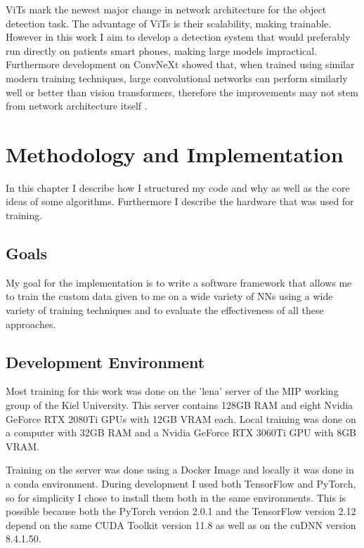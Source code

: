 \documentclass[10pt]{book}
\begin{document}
\acp{ViT} mark the newest major change in network architecture for the object detection task. The advantage of \acp{ViT} is their scalability, making \cite[models of unprecedented size]{dosovitskiy2020image} trainable. However in this work I aim to develop a detection system that would preferably run directly on patients smart phones, making large models impractical. Furthermore development on ConvNeXt showed that, when trained using similar modern training techniques, large convolutional networks can perform similarly well or better than vision transformers, therefore the improvements may not stem from network architecture itself \cite{liu2022convnet}.

\chapter{Methodology and Implementation}
\label{chap:implement}

In this chapter I describe how I structured my code and why as well as the core ideas of some algorithms. Furthermore I describe the hardware that was used for training.

\section{Goals}

My goal for the implementation is to write a software framework that allows me to train the custom data given to me on a wide variety of \acp{NN} using a wide variety of training techniques and to evaluate the effectiveness of all these approaches.

\section{Development Environment}

Most training for this work was done on the 'lena' server of the \ac{MIP} working group of the Kiel University. This server contains 128GB RAM and eight Nvidia GeForce RTX 2080Ti \acp{GPU} with 12GB VRAM each. Local training was done on a computer with 32GB RAM and a Nvidia GeForce RTX 3060Ti \ac{GPU} with 8GB VRAM.

Training on the server was done using a Docker Image and locally it was done in a conda environment. During development I used both TensorFlow and PyTorch, so for simplicity I chose to install them both in the same environments. This is possible because both the PyTorch version 2.0.1 and the TensorFlow version 2.12 depend on the same \ac{CUDA} Toolkit version 11.8 as well as on the \ac{cuDNN} version 8.4.1.50.
\end{document}
